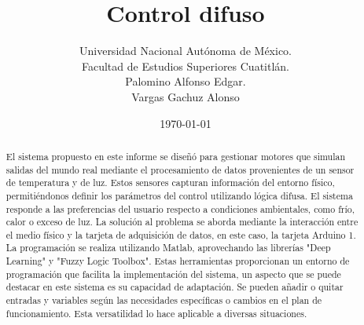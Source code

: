 \documentclass[a4paper, 12pt]{article}
\title{Control difuso}
\author{Universidad Nacional Autónoma de México.\\Facultad de Estudios Superiores Cuatitlán.\\Palomino Alfonso Edgar.\\Vargas Gachuz Alonso}
\date{\today}
\begin{document}
    \maketitle 
    \begin{abstract}
        El sistema propuesto en este informe se diseñó para gestionar motores que simulan salidas del mundo real mediante el procesamiento de datos provenientes de un sensor de temperatura y de luz. Estos sensores capturan información del entorno físico, permitiéndonos definir los parámetros del control utilizando lógica difusa. El sistema responde a las preferencias del usuario respecto a condiciones ambientales, como frío, calor o exceso de luz.
        La solución al problema se aborda mediante la interacción entre el medio físico y la tarjeta de adquisición de datos, en este caso, la tarjeta Arduino 1. La programación se realiza utilizando Matlab, aprovechando las librerías "Deep Learning" y "Fuzzy Logic Toolbox". Estas herramientas proporcionan un entorno de programación que facilita la implementación del sistema, un aspecto que se puede  destacar en este sistema es su capacidad de adaptación. Se pueden añadir o quitar entradas y variables según las necesidades específicas o cambios en el plan de funcionamiento. Esta versatilidad lo hace aplicable a diversas situaciones.        
    \end{abstract} 
    \vspace{2ex}
\end{document}
